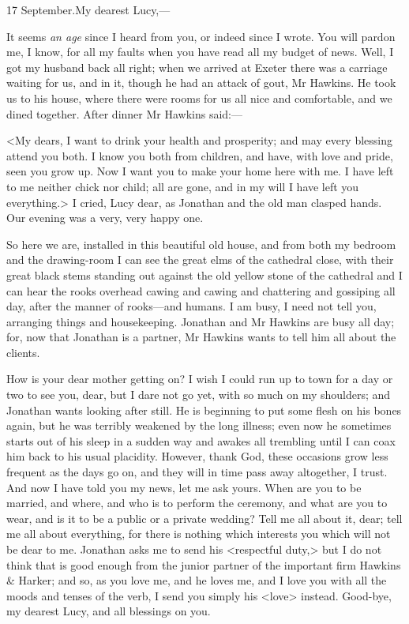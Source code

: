 \begin{mail}{17 September.}{My dearest Lucy,— }

It seems \textit{an age} since I heard from you, or indeed since I wrote. You will pardon me, I know, for all my faults when you have read all my budget of news. Well, I got my husband back all right; when we arrived at Exeter there was a carriage waiting for us, and in it, though he had an attack of gout, Mr Hawkins. He took us to his house, where there were rooms for us all nice and comfortable, and we dined together. After dinner Mr Hawkins said:—

<My dears, I want to drink your health and prosperity; and may every blessing attend you both. I know you both from children, and have, with love and pride, seen you grow up. Now I want you to make your home here with me. I have left to me neither chick nor child; all are gone, and in my will I have left you everything.> I cried, Lucy dear, as Jonathan and the old man clasped hands. Our evening was a very, very happy one.

So here we are, installed in this beautiful old house, and from both my bedroom and the drawing-room I can see the great elms of the cathedral close, with their great black stems standing out against the old yellow stone of the cathedral and I can hear the rooks overhead cawing and cawing and chattering and gossiping all day, after the manner of rooks—and humans. I am busy, I need not tell you, arranging things and housekeeping. Jonathan and Mr Hawkins are busy all day; for, now that Jonathan is a partner, Mr Hawkins wants to tell him all about the clients.

How is your dear mother getting on? I wish I could run up to town for a day or two to see you, dear, but I dare not go yet, with so much on my shoulders; and Jonathan wants looking after still. He is beginning to put some flesh on his bones again, but he was terribly weakened by the long illness; even now he sometimes starts out of his sleep in a sudden way and awakes all trembling until I can coax him back to his usual placidity. However, thank God, these occasions grow less frequent as the days go on, and they will in time pass away altogether, I trust. And now I have told you my news, let me ask yours. When are you to be married, and where, and who is to perform the ceremony, and what are you to wear, and is it to be a public or a private wedding? Tell me all about it, dear; tell me all about everything, for there is nothing which interests you which will not be dear to me. Jonathan asks me to send his <respectful duty,> but I do not think that is good enough from the junior partner of the important firm Hawkins \& Harker; and so, as you love me, and he loves me, and I love you with all the moods and tenses of the verb, I send you simply his <love> instead. Good-bye, my dearest Lucy, and all blessings on you.

\end{mail}

